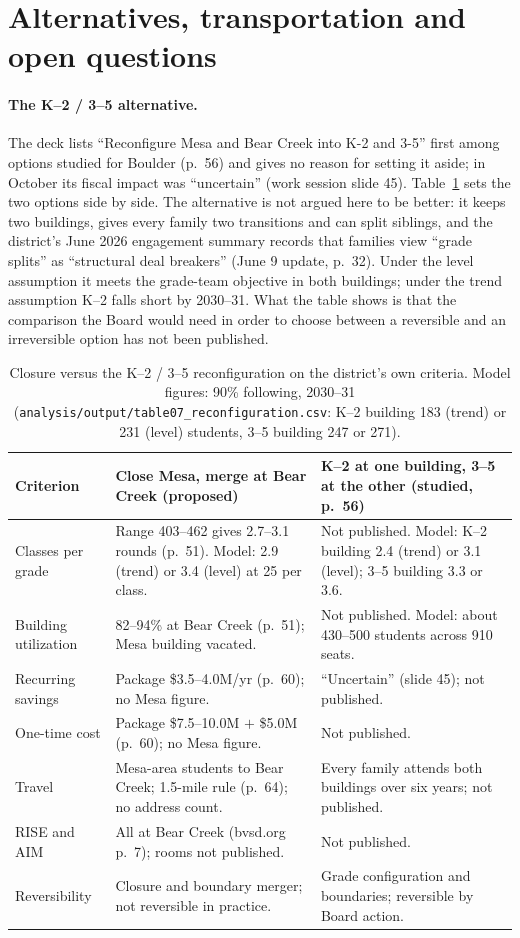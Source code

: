 \documentclass[11pt]{article}
\begin{document}
\section{Alternatives, transportation and open questions}\label{app:alternatives}
\paragraph{The K--2 / 3--5 alternative.} The deck lists ``Reconfigure Mesa and Bear Creek into K-2 and 3-5'' first among options studied for Boulder (p.\ 56) and gives no reason for setting it aside; in October its fiscal impact was ``uncertain'' (work session slide 45). Table~\ref{tab:k25} sets the two options side by side. The alternative is not argued here to be better: it keeps two buildings, gives every family two transitions and can split siblings, and the district's June 2026 engagement summary records that families view ``grade splits'' as ``structural deal breakers'' (June 9 update, p.\ 32). Under the level assumption it meets the grade-team objective in both buildings; under the trend assumption K--2 falls short by 2030--31. What the table shows is that the comparison the Board would need in order to choose between a reversible and an irreversible option has not been published.

\begin{table}[htbp]\centering\small
\caption{Closure versus the K--2 / 3--5 reconfiguration on the district's own criteria. Model figures: 90\% following, 2030--31 (\texttt{analysis/output/table07\_reconfiguration.csv}: K--2 building 183 (trend) or 231 (level) students, 3--5 building 247 or 271).}\label{tab:k25}
\begin{tabular}{p{3.0cm}p{5.4cm}p{5.4cm}}
\toprule
Criterion & Close Mesa, merge at Bear Creek (proposed) & K--2 at one building, 3--5 at the other (studied, p.\ 56) \\
\midrule
Classes per grade & Range 403--462 gives 2.7--3.1 rounds (p.\ 51). Model: 2.9 (trend) or 3.4 (level) at 25 per class. & Not published. Model: K--2 building 2.4 (trend) or 3.1 (level); 3--5 building 3.3 or 3.6. \\
Building utilization & 82--94\% at Bear Creek (p.\ 51); Mesa building vacated. & Not published. Model: about 430--500 students across 910 seats. \\
Recurring savings & Package \$3.5--4.0M/yr (p.\ 60); no Mesa figure. & ``Uncertain'' (slide 45); not published. \\
One-time cost & Package \$7.5--10.0M $+$ \$5.0M (p.\ 60); no Mesa figure. & Not published. \\
Travel & Mesa-area students to Bear Creek; 1.5-mile rule (p.\ 64); no address count. & Every family attends both buildings over six years; not published. \\
RISE and AIM & All at Bear Creek (bvsd.org p.\ 7); rooms not published. & Not published. \\
Reversibility & Closure and boundary merger; not reversible in practice. & Grade configuration and boundaries; reversible by Board action. \\
\bottomrule
\end{tabular}
\end{table}
\end{document}
